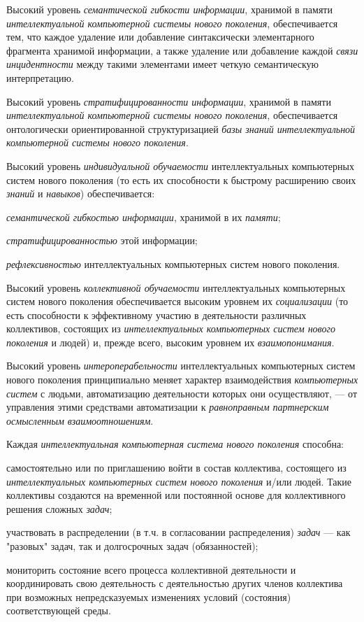 Высокий уровень \textit{семантической гибкости информации}, хранимой в памяти \textit{интеллектуальной компьютерной системы нового поколения}, обеспечивается тем, что каждое удаление или добавление синтаксически элементарного фрагмента хранимой информации, а также удаление или добавление каждой \textit{связи инцидентности} между такими элементами имеет четкую семантическую интерпретацию.

Высокий уровень \textit{стратифицированности информации}, хранимой в памяти \textit{интеллектуальной компьютерной системы нового поколения}, обеспечивается онтологически ориентированной структуризацией \textit{базы знаний интеллектуальной компьютерной системы нового поколения}.

Высокий уровень \textit{индивидуальной обучаемости} интеллектуальных компьютерных систем нового поколения (то есть их способности к быстрому расширению своих \textit{знаний} и \textit{навыков}) обеспечивается:

\begin{textitemize}
	\item \textit{семантической гибкостью информации}, хранимой в их \textit{памяти};
	\item \textit{стратифицированностью} этой информации;
	\item \textit{рефлексивностью} интеллектуальных компьютерных систем нового поколения.
\end{textitemize}

Высокий уровень \textit{коллективной обучаемости} интеллектуальных компьютерных систем нового поколения обеспечивается высоким уровнем их \textit{социализации} (то есть способности к эффективному участию в деятельности различных коллективов, состоящих из \textit{интеллектуальных компьютерных систем нового поколения} и людей) и, прежде всего, высоким уровнем их \textit{взаимопонимания}.

Высокий уровень \textit{интероперабельности} интеллектуальных компьютерных систем нового поколения принципиально меняет характер взаимодействия \textit{компьютерных систем} с людьми, автоматизацию деятельности которых они осуществляют, --- от управления этими средствами автоматизации к \textit{равноправным партнерским осмысленным взаимоотношениям}.

Каждая \textit{интеллектуальная компьютерная система нового поколения} способна:

\begin{textitemize}
	\item самостоятельно или по приглашению войти в состав коллектива, состоящего из \textit{интеллектуальных компьютерных систем нового поколения} и/или людей. Такие коллективы создаются на временной или постоянной основе для коллективного решения сложных \textit{задач};
	\item участвовать в распределении (в т.ч. в согласовании распределения) \textit{задач} --- как "разовых"{} задач, так и долгосрочных задач (обязанностей);
	\item мониторить состояние всего процесса коллективной деятельности и координировать свою деятельность с деятельностью других членов коллектива при возможных непредсказуемых изменениях условий (состояния) соответствующей среды.
\end{textitemize}

